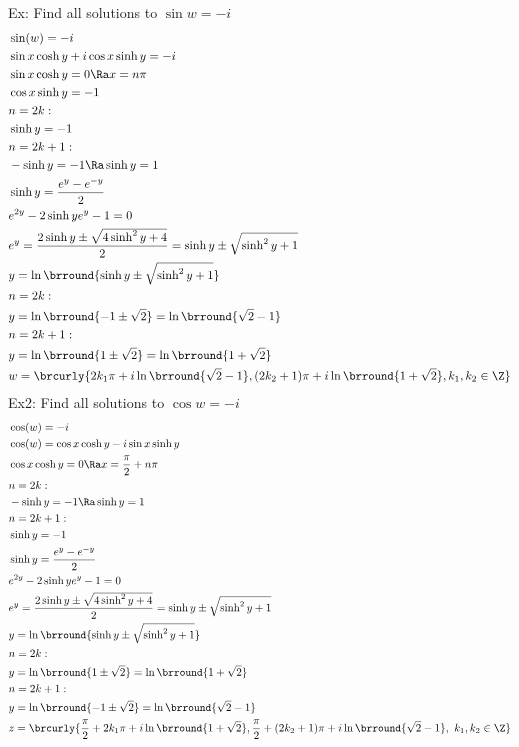 Ex: Find all solutions to $\sin w=-i$
\begin{align*}
    &\sin(w)=-i\\
    &\sin x\cosh y+i\cos x\sinh y=-i\\
    &\sin x\cosh y=0\Ra x=n\pi\\
    &\cos x\sinh y =-1\\
    &n=2k:\\
    &\sinh y =-1\\
    &n=2k+1:\\
    &-\sinh y=-1\Ra \sinh y=1\\
    &\sinh y=\frac{e^y-e^{-y}}{2}\\
    &e^{2y}-2\sinh y e^y-1=0\\
    &e^{y}=\frac{2\sinh y\pm\sqrt{4\sinh^2y+4}}{2}=\sinh y\pm \sqrt{\sinh^2y+1}\\
    &y=\ln\brround{\sinh y\pm\sqrt{\sinh^2 y+1}}\\
    &n=2k:\\
    &y=\ln\brround{-1\pm\sqrt{2}}=\ln\brround{\sqrt{2}-1}\\
    &n=2k+1:\\
    &y=\ln\brround{1\pm\sqrt{2}}=\ln\brround{1+\sqrt{2}}\\
    &w=\brcurly{2k_1\pi+i\ln\brround{\sqrt{2}-1},(2k_2+1)\pi+i\ln\brround{1+\sqrt{2}},k_1,k_2\in\Z}
\end{align*}
Ex2: Find all solutions to $\cos w=-i$
\begin{align*}
    &\cos(w)=-i\\
    &\cos(w)=\cos x\cosh y-i\sin x\sinh y\\
    &\cos x\cosh y=0\Ra x=\frac{\pi}{2}+n\pi\\
    &n=2k:\\
    &-\sinh y=-1\Ra \sinh y=1\\
    &n=2k+1:\\
    &\sinh y=-1\\
    &\sinh y=\frac{e^y-e^{-y}}{2}\\
    &e^{2y}-2\sinh ye^y-1=0\\
    &e^y=\frac{2\sinh y\pm\sqrt{4\sinh^2 y+4}}{2}=\sinh y\pm\sqrt{\sinh^2y+1}\\
    &y=\ln\brround{\sinh y\pm\sqrt{\sinh^2y+1}}\\
    &n=2k:\\
    &y=\ln\brround{1\pm\sqrt{2}}=\ln\brround{1+\sqrt{2}}\\
    &n=2k+1:\\
    &y=\ln\brround{-1\pm\sqrt{2}}=\ln\brround{\sqrt{2}-1}\\
    &z=\brcurly{\frac{\pi}{2}+2k_1\pi+i\ln\brround{1+\sqrt{2}},\frac{\pi}{2}+(2k_2+1)\pi+i\ln\brround{\sqrt{2}-1},\ k_1,k_2\in\Z}
\end{align*}
